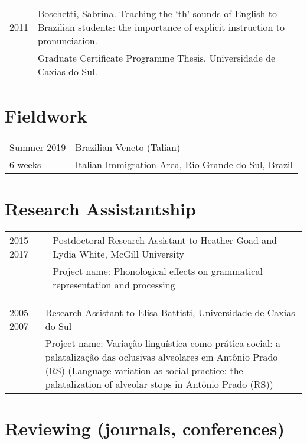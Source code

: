 \documentclass[letterpaper,10pt]{article}
\begin{document}
 
 \begin{tabular}{p{1.6cm}p{15.2cm}}
2011    & Boschetti, Sabrina. Teaching the `th' sounds of English to Brazilian students: the importance of explicit instruction to pronunciation.\\
    & Graduate Certificate Programme Thesis, Universidade de Caxias do Sul.
\end{tabular}

\vspace{0.3cm}

 
 \section{Fieldwork}

\begin{tabular}{p{2.6cm}p{13.6cm}}
Summer 2019		& Brazilian Veneto (Talian)\\
6 weeks				& Italian Immigration Area, Rio Grande do Sul, Brazil 
 
\end{tabular}



\vspace{0.3cm}
 

\section{Research Assistantship}
\begin{tabular}{p{1.6cm}p{15.2cm}}	
 2015-2017 & Postdoctoral Research Assistant to Heather Goad and Lydia White, McGill University\\
 & Project name: Phonological effects on grammatical representation and processing
    \end{tabular}
    
 
 \begin{tabular}{p{1.6cm}p{15.2cm}}
2005-2007 & Research Assistant to Elisa Battisti, Universidade de Caxias do Sul\\
    & Project name: Varia\c{c}\~ao lingu\'istica como pr\'atica social: a palataliza\c{c}\~ao das oclusivas alveolares em Ant\^onio Prado (RS) (Language variation as social practice: the palatalization of alveolar stops in Ant\^onio Prado (RS))  
\end{tabular}

\vspace{0.3cm}

 

\section{Reviewing (journals, conferences)}
\end{document}
